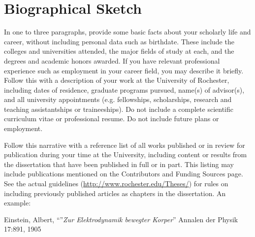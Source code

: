 \documentclass[\main/master.tex]{subfiles}
\begin{document}
\chapter*{Biographical Sketch}
\hspace{5 mm} In one to three paragraphs, provide some basic facts about your scholarly life and career, without including personal data such as birthdate. These include the colleges and universities attended, the major fields of study at each, and the degrees and academic honors awarded. If you have relevant professional experience such as employment in your career field, you may describe it briefly. Follow this with a description of your work at the University of Rochester, including dates of residence, graduate programs pursued, name(s) of advisor(s), and all university appointments (e.g. fellowships, scholarships, research and teaching assistantships or traineeships). Do not include a complete scientific curriculum vitae or professional resume. Do not include future plans or employment. \par
Follow this narrative with a reference list of all works published or in review for publication during your
time at the University, including content or results from the dissertation that have been published in full or in
part. This listing may include publications mentioned on the Contributors and Funding Sources page. See the actual guidelines (\url{http://www.rochester.edu/Theses/}) for rules on including previously published articles as chapters in the dissertation. \newline 
An example: \par
[1] Einstein, Albert, ``''\emph{Zur Elektrodynamik bewegter Korper}'' Annalen der Physik 17:891, 1905 \newline
\end{document}
